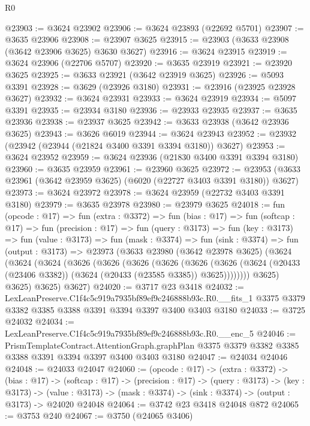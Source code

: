 \begin{lexlean}{R0}
\begin{coremodule}
@23903 := @3624 @23902
@23906 := @3624 @23893 (@22692 @5701)
@23907 := @3635 @23906
@23908 := @23907 @3625
@23915 := @23903 (@3633 @23908 (@3642 @23906 @3625) @3630 @3627)
@23916 := @3624 @23915
@23919 := @3624 @23906 (@22706 @5707)
@23920 := @3635 @23919
@23921 := @23920 @3625
@23925 := @3633 @23921 (@3642 @23919 @3625)
@23926 := @5093 @3391
@23928 := @3629 (@23926 @3180)
@23931 := @23916 (@23925 @23928 @3627)
@23932 := @3624 @23931
@23933 := @3624 @23919
@23934 := @5097 @3391
@23935 := @23934 @3180
@23936 := @23933 @23935
@23937 := @3635 @23936
@23938 := @23937 @3625
@23942 := @3633 @23938 (@3642 @23936 @3625)
@23943 := @3626 @6019
@23944 := @3624 @23943
@23952 := @23932 (@23942 (@23944 (@21824 @3400 @3391 @3394 @3180)) @3627)
@23953 := @3624 @23952
@23959 := @3624 @23936 (@21830 @3400 @3391 @3394 @3180)
@23960 := @3635 @23959
@23961 := @23960 @3625
@23972 := @23953 (@3633 @23961 (@3642 @23959 @3625) (@6020 (@22727 @3403 @3391 @3180)) @3627)
@23973 := @3624 @23972
@23978 := @3624 @23959 (@22732 @3403 @3391 @3180)
@23979 := @3635 @23978
@23980 := @23979 @3625
@24018 := fun (opcode : @17) =>
  fun (extra : @3372) =>
  fun (bias : @17) =>
  fun (softcap : @17) =>
  fun (precision : @17) =>
  fun (query : @3173) =>
  fun (key : @3173) =>
  fun (value : @3173) =>
  fun (mask : @3374) =>
  fun (sink : @3374) =>
  fun (output : @3173) =>
  @23973
    (@3633
      @23980
      (@3642 @23978 @3625)
      (@3624
        (@3624
          (@3624
            (@3626
              (@3626
                (@3626
                  (@3626
                    (@3626
                      (@3626
                        (@3624 (@20433 (@23406 @3382)) (@3624 (@20433 (@23585 @3385)) @3625))))))))
            @3625)
          @3625)
        @3625)
      @3627)
@24020 := @3717 @23 @3418
@24032 := LexLeanPreserve.C1f4c5c919a7935bf89ef9c246888b93c.R0.__fits_1
    @3375
    @3379
    @3382
    @3385
    @3388
    @3391
    @3394
    @3397
    @3400
    @3403
    @3180
@24033 := @3725 @24032
@24034 := LexLeanPreserve.C1f4c5c919a7935bf89ef9c246888b93c.R0.__enc_5
@24046 := PrismTemplateContract.AttentionGraph.graphPlan
    @3375
    @3379
    @3382
    @3385
    @3388
    @3391
    @3394
    @3397
    @3400
    @3403
    @3180
@24047 := @24034 @24046
@24048 := @24033 @24047
@24060 := (opcode : @17) ->
  (extra : @3372) ->
  (bias : @17) ->
  (softcap : @17) ->
  (precision : @17) ->
  (query : @3173) ->
  (key : @3173) ->
  (value : @3173) -> (mask : @3374) -> (sink : @3374) -> (output : @3173) -> @24020 @24048
@24064 := @3742 @23 @3418 @24048 @872
@24065 := @3753 @240
@24067 := @3750 (@24065 @3406)

\end{coremodule}
\end{lexlean}

